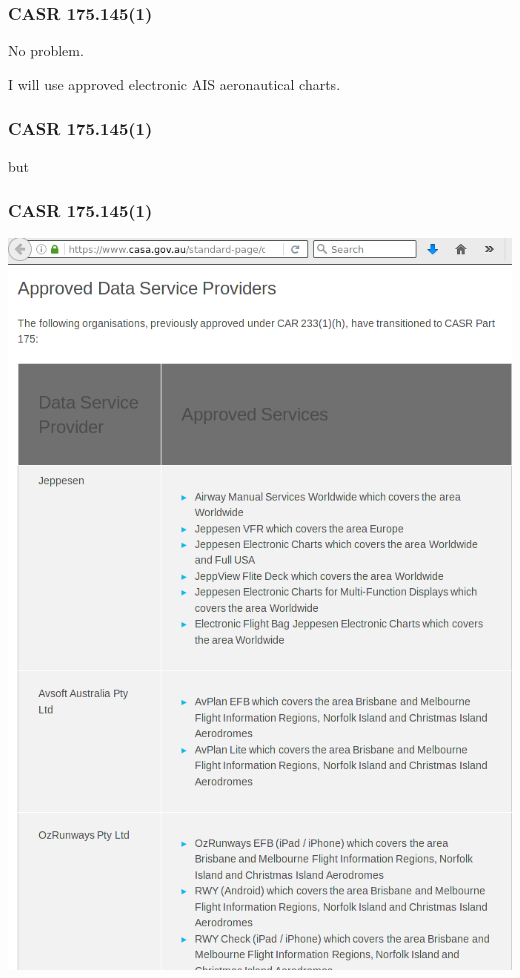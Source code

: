 \begin{frame}
\frametitle{CASR 175.145(1)}
\large
\begin{center}
No problem.
\par
I will use approved electronic AIS aeronautical charts.
\end{center}
\end{frame}

\begin{frame}
\frametitle{CASR 175.145(1)}
\large
\begin{center}
but
\end{center}
\end{frame}

\begin{frame}
\frametitle{CASR 175.145(1)}
\begin{center}
\includegraphics[height=0.8\textheight]{image/casa-approved-data-service-providers.png}
\end{center}
\end{frame}

